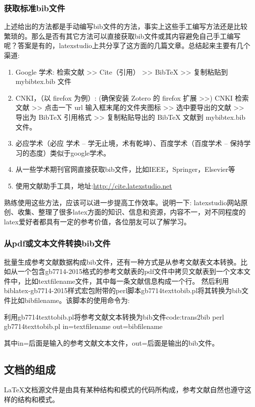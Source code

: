 \documentclass[twoside]{article} %
\begin{document}
\subsubsection{获取标准bib文件}
上述给出的方法都是手动编写bib文件的方法，事实上这些手工编写方法还是比较繁琐的。那么是否有其它方法可以直接获取bib文件或其内容避免自己手工编写呢？答案是有的，latexstudio上共分享了这方面的几篇文章\cite{北京交通大学研究生公众号2016--}\cite{olref2016--}\cite{文献助手2016--}。总结起来主要有几个渠道:
\begin{enumerate}
  \item Google 学术: 检索文献 >> Cite（引用） >> BibTeX >> 复制粘贴到 mybibtex.bib 文件
  \item CNKI，（以 firefox 为例）: (确保安装 Zotero 的 firefox 扩展 >>) CNKI 检索文献 >> 点击一下 url 输入框末尾的文件夹图标 >> 选中要导出的文献 >> 导出为 BibTeX 引用格式 >> 复制粘贴导出的 BibTeX 文献到 mybibtex.bib 文件。
  \item 必应学术（必应 学术 – 学无止境，术有乾坤）、百度学术（百度学术 – 保持学习的态度）类似于google学术。
  \item 从一些学术期刊官网直接获取bib文件，比如IEEE，Springer，Elsevier等
  \item 使用文献助手工具，地址:\url{http://cite.latexstudio.net}
\end{enumerate}

熟练使用这些方法，应该可以进一步提高工作效率。说明一下: latexstudio网站原创、收集、整理了很多latex方面的知识、信息和资源，内容不一，对不同程度的latex爱好者都具有一定的参考价值，各位朋友可以了解学习。


\subsubsection{从pdf或文本文件转换bib文件}
批量生成参考文献数据构成bib文件，还有一种方式是从参考文献表文本转换。比如从一个包含gb7714-2015格式的参考文献表的pdf文件中拷贝文献表到一个文本文件中，比如textfilename文件，其中每一条文献信息构成一个行。
然后利用biblatex-gb7714-2015样式宏包附带的perl脚本gb7714texttobib.pl将其转换为bib文件比如bibfilename。该脚本的使用命令为:

\begin{codetex}{利用gb7714texttobib.pl将参考文献文本转换为bib文件}{code:trans2bib}
perl gb7714texttobib.pl in=textfilename out=bibfilename
\end{codetex}

其中in=后面是输入的参考文献文本文件，out=后面是输出的bib文件。

\subsection{文档的组成}
\LaTeX 文档源文件是由具有某种结构和模式的代码所构成，参考文献自然也遵守这样的结构和模式。
\end{document}
